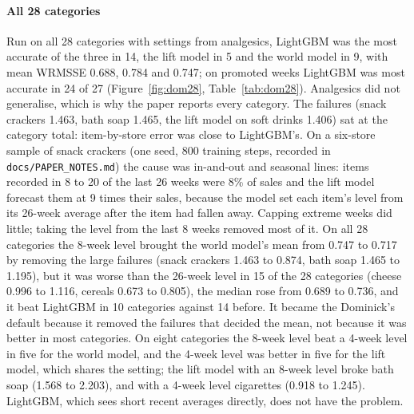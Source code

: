 \paragraph{All 28 categories}
Run on all 28 categories with settings from analgesics, LightGBM was the most
accurate of the three in 14, the lift model in 5 and the world model in 9, with
mean WRMSSE 0.688, 0.784 and 0.747; on promoted weeks LightGBM was most accurate
in 24 of 27 (Figure~\ref{fig:dom28}, Table~\ref{tab:dom28}). Analgesics did not
generalise, which is why the paper reports every category. The failures (snack
crackers 1.463, bath soap 1.465, the lift model on soft drinks 1.406) sat at the
category total: item-by-store error was close to LightGBM's. On a six-store
sample of snack crackers (one seed, 800 training steps, recorded in
\texttt{docs/PAPER\_NOTES.md}) the cause was in-and-out and seasonal lines: items
recorded in 8 to 20 of the last 26 weeks were 8\% of sales and the lift model
forecast them at 9 times their sales, because the model set each item's level from its 26-week
average after the item had fallen away. Capping extreme weeks did little; taking
the level from the last 8 weeks removed most of it. On all 28 categories the
8-week level brought the world model's mean from 0.747 to 0.717 by removing the
large failures (snack crackers 1.463 to 0.874, bath soap 1.465 to 1.195), but it
was worse than the 26-week level in 15 of the 28 categories (cheese 0.996 to
1.116, cereals 0.673 to 0.805), the median rose from 0.689 to 0.736, and it beat
LightGBM in 10 categories against 14 before. It became the Dominick's default
because it removed the failures that decided the mean, not because it was
better in most categories. On eight categories the 8-week level beat a 4-week level in five for the world
model, and the 4-week level was better in five for the lift model, which shares
the setting; the lift model with an 8-week level broke bath soap (1.568 to
2.203), and with a 4-week level cigarettes (0.918 to 1.245). LightGBM, which sees short recent averages directly, does not have
the problem.



